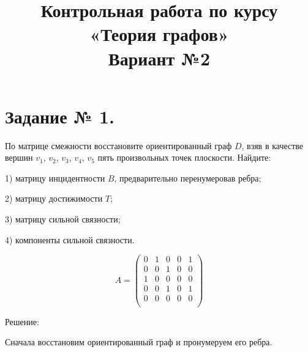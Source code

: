 \documentclass[fleqn]{article}
\title{Контрольная работа по курсу «Теория графов»\\
Вариант №2}
\begin{document}
\date{}
\maketitle
\section*{Задание № 1.}

По матрице смежности восстановите ориентированный граф $D$,
взяв в качестве вершин $v_1$, $v_2$, $v_3$, $v_4$, $v_5$ пять произвольных точек плоскости. Найдите:

1) матрицу инцидентности $B$, предварительно перенумеровав ребра;

2) матрицу достижимости $T$;

3) матрицу сильной связности;

4) компоненты сильной связности.

$$A = \begin{pmatrix}
0 & 1 & 0 & 0 & 1 \\
0 & 0 & 1 & 0 & 0 \\
1 & 0 & 0 & 0 & 0 \\
0 & 0 & 1 & 0 & 1 \\
0 & 0 & 0 & 0 & 0 \\
\end{pmatrix}
$$

\begin{center}Решение:\end{center}

Сначала восстановим ориентированный граф и пронумеруем его ребра.

\medskip

\end{document}
